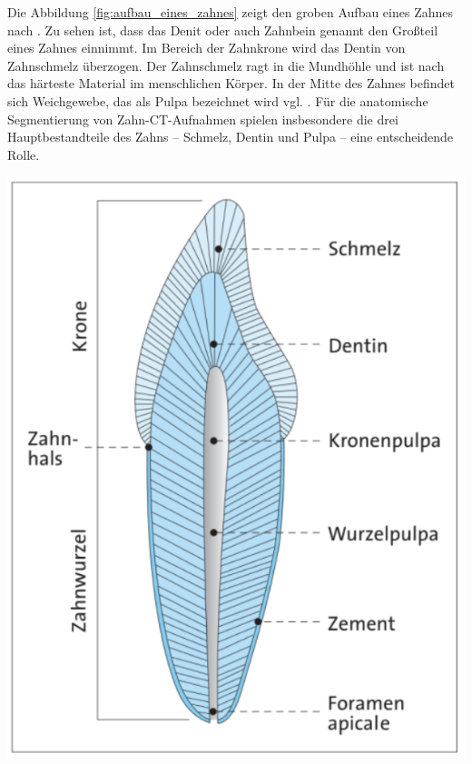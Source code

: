 \begin{minipage}{0.40\textwidth}
	Die Abbildung \ref{fig:aufbau_eines_zahnes} zeigt den groben Aufbau eines Zahnes
	nach \citet[S.~17]{lehmann2012Zahnheilkunde}. Zu sehen ist, dass das Denit
	oder auch Zahnbein genannt den Großteil eines Zahnes einnimmt. Im Bereich der Zahnkrone
	wird das Dentin von Zahnschmelz überzogen. Der Zahnschmelz ragt in die
	Mundhöhle und ist nach \citet[S.~41]{lehmann2012Zahnheilkunde} das härteste Material
	im menschlichen Körper. In der Mitte des Zahnes befindet sich Weichgewebe, das
	als Pulpa bezeichnet wird vgl. \citep[vgl.][S.~15]{lehmann2012Zahnheilkunde}.
	Für die anatomische Segmentierung von Zahn-\ac{CT}-Aufnahmen spielen insbesondere
	die drei Hauptbestandteile des Zahns – Schmelz, Dentin und Pulpa – eine
	entscheidende Rolle.
\end{minipage}
\hfill
\begin{minipage}{0.50\textwidth}
	\centering
	\includegraphics[scale=0.50]{img/aufbau_eines_zahns.jpg}
	\label{fig:aufbau_eines_zahnes}
\end{minipage}

